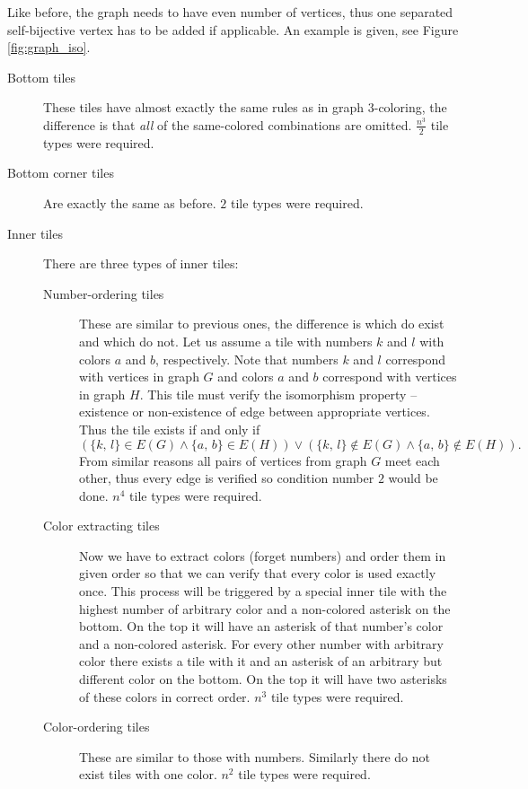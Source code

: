 Like before, the graph needs to have even number of vertices, thus one separated self-bijective vertex has to be added if applicable. An example is given, see Figure \ref{fig:graph_iso}.
\begin{description}
	\item[Bottom tiles] These tiles have almost exactly the same rules as in graph 3-coloring, the difference is that {\em all} of the same-colored combinations are omitted. $\frac{n^3}{2}$ tile types were required.
	\item[Bottom corner tiles] Are exactly the same as before. $2$ tile types were required.
	\item[Inner tiles] There are three types of inner tiles:
	\begin{description}
		\item[Number-ordering tiles] These are similar to previous ones, the difference is which do exist and which do not. Let us assume a tile with numbers $k$ and $l$ with colors $a$ and $b$, respectively. Note that numbers $k$ and $l$ correspond with vertices in graph $G$ and colors $a$ and $b$ correspond with vertices in graph $H$. This tile must verify the isomorphism property -- existence or non-existence of edge between appropriate vertices. Thus the tile exists if and only if
		$$(\{k,\,l\} \in E(G) \wedge \{a,\,b\} \in E(H)) \vee (\{k,\,l\} \notin E(G) \wedge \{a,\,b\} \notin E(H)) . $$
		From similar reasons all pairs of vertices from graph $G$ meet each other, thus every edge is verified so condition number $2$ would be done. $n^4$ tile types were required.
		\item[Color extracting tiles] Now we have to extract colors (forget numbers) and order them in given order so that we can verify that every color is used exactly once. This process will be triggered by a special inner tile with the highest number of arbitrary color and a non-colored asterisk on the bottom. On the top it will have an asterisk of that number's color and a non-colored asterisk. For every other number with arbitrary color there exists a tile with it and an asterisk of an arbitrary but different color on the bottom. On the top it will have two asterisks of these colors in correct order. $n^3$ tile types were required.
		\item[Color-ordering tiles] These are similar to those with numbers. Similarly there do not exist tiles with one color. $n^2$ tile types were required.

\end{description}
\end{description}
